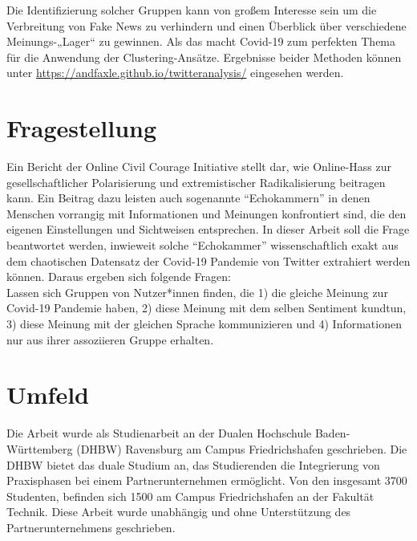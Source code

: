 Die Identifizierung solcher Gruppen kann von großem Interesse sein um die Verbreitung von Fake News zu verhindern und einen Überblick über verschiedene Meinungs-„Lager“ zu gewinnen. Als das macht Covid-19 zum perfekten Thema für die Anwendung der Clustering-Ansätze.
Ergebnisse beider Methoden können unter \url{https://andfaxle.github.io/twitteranalysis/} eingesehen werden.
\section{Fragestellung}
\label{sec:fragestellung}
Ein Bericht der Online Civil Courage Initiative stellt dar, wie Online-Hass zur gesellschaftlicher Polarisierung und extremistischer Radikalisierung beitragen kann.
Ein Beitrag dazu leisten auch sogenannte "`Echokammern"' in denen Menschen vorrangig mit Informationen und Meinungen konfrontiert sind, die den eigenen Einstellungen und Sichtweisen entsprechen. \cite{hassrede} In dieser Arbeit soll die Frage beantwortet werden, inwieweit solche "`Echokammer"' wissenschaftlich exakt aus dem chaotischen Datensatz der Covid-19 Pandemie von Twitter extrahiert werden können. Daraus ergeben sich folgende Fragen: \\ \newline
Lassen sich Gruppen von Nutzer*innen finden, die 1) die gleiche Meinung zur Covid-19 Pandemie haben, 2) diese Meinung mit dem selben Sentiment kundtun, 3) diese Meinung mit der gleichen Sprache kommunizieren und 4) Informationen nur aus ihrer assoziieren Gruppe erhalten.
\section{Umfeld}
\label{sec:umfeld}
Die Arbeit wurde als Studienarbeit an der Dualen Hochschule Baden-Württemberg (DHBW) Ravensburg am Campus Friedrichshafen geschrieben. Die DHBW bietet das duale Studium an, das Studierenden die Integrierung von Praxisphasen bei einem Partnerunternehmen ermöglicht. Von den insgesamt 3700 Studenten, befinden sich 1500 am Campus Friedrichshafen an der Fakultät Technik.
Diese Arbeit wurde unabhängig und ohne Unterstützung des Partnerunternehmens geschrieben.
